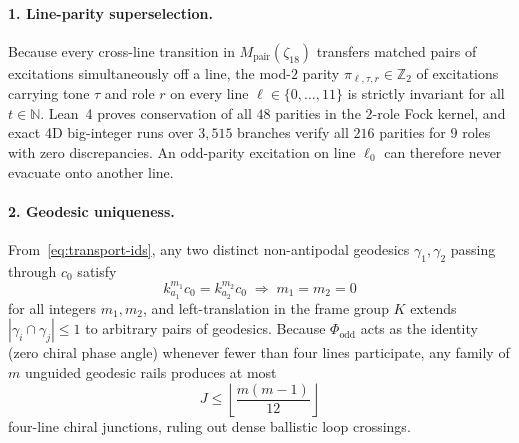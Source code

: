 \paragraph{1. Line-parity superselection.}
Because every cross-line transition in $M_{\mathrm{pair}}(\zeta_{18})$ transfers matched pairs of excitations simultaneously off a line, the mod-$2$ parity $\pi_{\ell,\tau,r} \in \mathbb{Z}_2$ of excitations carrying tone $\tau$ and role $r$ on every line $\ell \in \{0,\dots,11\}$ is strictly invariant for all $t \in \mathbb{N}$. Lean~4 proves conservation of all $48$ parities in the $2$-role Fock kernel, and exact 4D big-integer runs over $3{,}515$ branches verify all $216$ parities for $9$ roles with zero discrepancies. An odd-parity excitation on line $\ell_0$ can therefore never evacuate onto another line.

\paragraph{2. Geodesic uniqueness.}
From~\eqref{eq:transport-ids}, any two distinct non-antipodal geodesics $\gamma_1, \gamma_2$ passing through $c_0$ satisfy
\begin{equation}
\label{eq:geodesic-uniq}
k_{a_1}^{m_1} c_0 = k_{a_2}^{m_2} c_0 \;\Longrightarrow\; m_1 = m_2 = 0
\end{equation}
for all integers $m_1, m_2$, and left-translation in the frame group $K$ extends $|\gamma_i \cap \gamma_j| \le 1$ to arbitrary pairs of geodesics. Because $\Phi_{\mathrm{odd}}$ acts as the identity (zero chiral phase angle) whenever fewer than four lines participate, any family of $m$ unguided geodesic rails produces at most
\begin{equation}
\label{eq:junction-cap}
J \le \left\lfloor \frac{m(m-1)}{12} \right\rfloor
\end{equation}
four-line chiral junctions, ruling out dense ballistic loop crossings.

